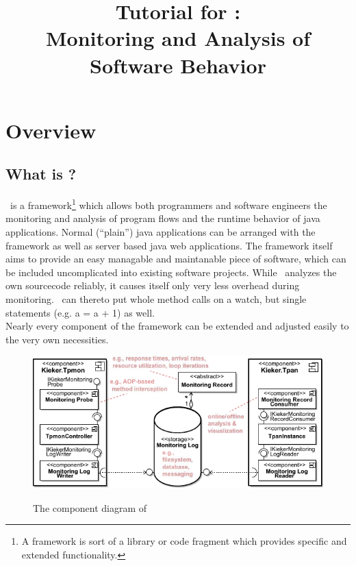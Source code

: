 \documentclass[a4paper, oneside, 11pt]{scrartcl}
\title{Tutorial for \Kieker:\\ Monitoring and Analysis of Software Behavior}
\begin{document}
  \maketitle
  \tableofcontents
  \newpage

  \section{Overview}
    \subsection{What is \Kieker?}
      \Kieker\ is a framework\footnote{A framework is sort of a library or code fragment which provides specific and extended functionality.} which allows both programmers and software engineers the monitoring and analysis of program flows and the runtime behavior of java applications. Normal (``plain'') java applications can be arranged with the framework as well as server based java web applications. The framework itself aims to provide an easy managable and maintanable piece of software, which can be included uncomplicated into existing software projects. While \Kieker\ analyzes the own sourcecode reliably, it causes itself only very less overhead during monitoring. \Kieker\ can thereto put whole method calls on a watch, but single statements (e.g. a = a + 1) as well.\\
      Nearly every component of the framework can be extended and adjusted easily to the very own necessities.
      \begin{figure}[H]
	\begin{center}
	  \includegraphics[width=1.0\textwidth]{kiekerComponentDiagram.pdf}
	  \label{image:kiekercomponentdiagram}
	  \caption{The component diagram of \Kieker}
	\end{center}
      \end{figure}
\end{document}
